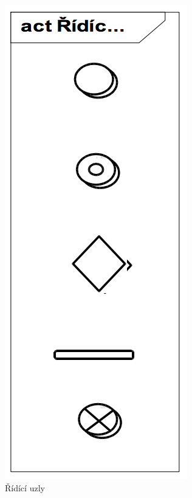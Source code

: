 \documentclass{szzclass}
\begin{document}
\begin{figure}[ht!]
\begin{minipage}{.5\textwidth}
  \includegraphics[width=.75\linewidth]{topics/bi-wsi-si-18/images/ridici-uzly.png}
  \caption{Řídící uzly}
\end{minipage}
\end{figure}
\end{document}
